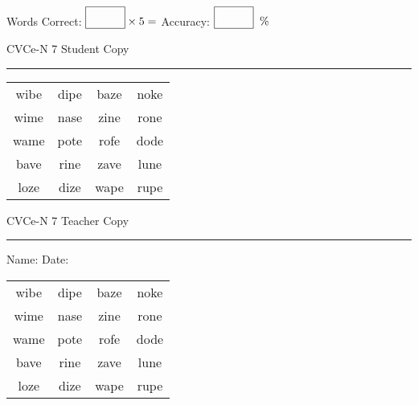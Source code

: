 \documentclass{memoir}
\begin{document}
\small

Words Correct: $\fbox{\phantom{\huge 100}} \times 5 = $ Accuracy: $\fbox{\phantom{\huge 100}}\;\; \%$ 

\vfill

\newpage


\footnotesize \noindent
CVCe-N 7 \hfill Student Copy
\smallskip
\hrule

\Large

\setlength{\tabcolsep}{14pt}
\def\arraystretch{2}

{\selectfont


\begin{vplace}[0.5]
\begin{center}
\begin{tabular}{cccc}
wibe & dipe & baze & noke \\
wime & nase & zine & rone \\
wame & pote & rofe & dode \\
bave & rine & zave & lune \\
loze & dize & wape & rupe \\
\end{tabular}
\end{center}
\end{vplace}

}

\newpage

\footnotesize \noindent
CVCe-N 7 \hfill Teacher Copy
\smallskip
\hrule

\small

\vfill

\noindent
Name: \underline{\hspace{1.75in}} \hfill Date: \underline{\hspace{1in}}

\Large

{\selectfont


\begin{vplace}[0.5]
\begin{center}
\begin{tabular}{cccc}
wibe & dipe & baze & noke \\
wime & nase & zine & rone \\
wame & pote & rofe & dode \\
bave & rine & zave & lune \\
loze & dize & wape & rupe \\
\end{tabular}
\end{center}
\end{vplace}



}
\end{document}
